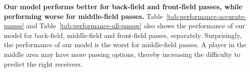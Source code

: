 \textbf{Our model performs better for back-field and front-field passes, while performing worse for middle-field passes.}
Table~\ref{tab:performance-accurate-passes} and Table~\ref{tab:performance-all-passes} also shows the performance of our model for back-field, middle-field and front-field passes, separately.
Surprisingly, the performance of our model is the worst for middle-field passes. A player in the middle area may have more passing options, thereby increasing the difficulty to predict the right receivers.

